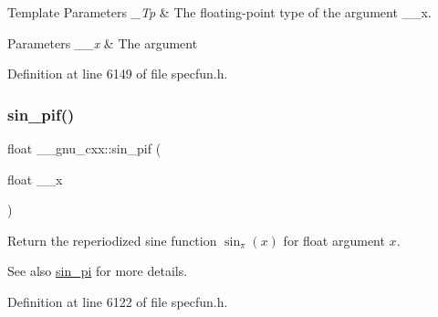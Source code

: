 \begin{DoxyTemplParams}{Template Parameters}
{\em \+\_\+\+Tp} & The floating-\/point type of the argument {\ttfamily \+\_\+\+\_\+x}. \\
\hline
\end{DoxyTemplParams}

\begin{DoxyParams}{Parameters}
{\em \+\_\+\+\_\+x} & The argument \\
\hline
\end{DoxyParams}


Definition at line 6149 of file specfun.\+h.

\mbox{\label{group__gnu__math__spec__func_ga74fc8e2dd770850e7ea8bf8a28a71777}} 
\subsubsection{\texorpdfstring{sin\+\_\+pif()}{sin\_pif()}}
{\footnotesize\ttfamily float \+\_\+\+\_\+gnu\+\_\+cxx\+::sin\+\_\+pif (\begin{DoxyParamCaption}\item[{float}]{\+\_\+\+\_\+x }\end{DoxyParamCaption})\hspace{0.3cm}{\ttfamily [inline]}}

Return the reperiodized sine function $ \sin_\pi(x) $ for {\ttfamily float} argument $ x $.

\begin{DoxySeeAlso}{See also}
\hyperlink{group__gnu__math__spec__func_ga220f8a9a0477697cff96e84dc911d5f0}{sin\+\_\+pi} for more details. 
\end{DoxySeeAlso}


Definition at line 6122 of file specfun.\+h.

\mbox{\label{group__gnu__math__spec__func_ga0bda860961b0a121e266b278f260634b}} 
